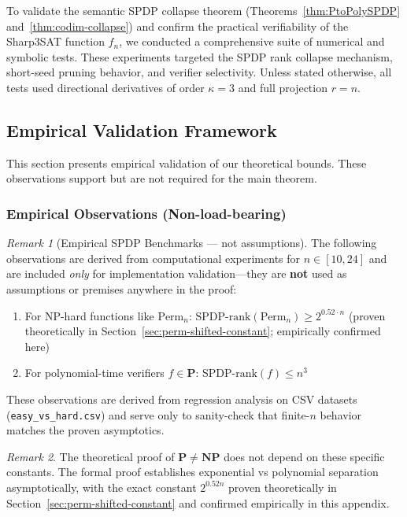 \documentclass[12pt]{article}
\theoremstyle{definition}
\theoremstyle{definition}
\theoremstyle{remark}
\newtheorem{remark}{Remark}
\theoremstyle{remark}
\begin{document}
To validate the semantic SPDP collapse theorem (Theorems~\ref{thm:PtoPolySPDP} and~\ref{thm:codim-collapse}) and confirm the practical verifiability of the Sharp3SAT function $f_n$, we conducted a comprehensive suite of numerical and symbolic tests. These experiments targeted the SPDP rank collapse mechanism, short-seed pruning behavior, and verifier selectivity. Unless stated otherwise, all tests used directional derivatives of order $\kappa = 3$ and full projection $r = n$.

\subsection{Empirical Validation Framework}
\label{sec:spdp-empirical-bounds}

This section presents empirical validation of our theoretical bounds. These observations support but are not required for the main theorem.

\subsubsection{Empirical Observations (Non-load-bearing)}

\begin{remark}[Empirical SPDP Benchmarks --- not assumptions]
\label{rem:empirical-bounds}
The following observations are derived from computational experiments for $n \in [10, 24]$
and are included \emph{only} for implementation validation---they are \textbf{not} used as
assumptions or premises anywhere in the proof:
\begin{enumerate}
\item For NP-hard functions like $\text{Perm}_n$: $\text{SPDP-rank}(\text{Perm}_n) \geq 2^{0.52 \cdot n}$ (proven theoretically in Section~\ref{sec:perm-shifted-constant}; empirically confirmed here)
\item For polynomial-time verifiers $f \in \mathbf{P}$: $\text{SPDP-rank}(f) \leq n^3$
\end{enumerate}
These observations are derived from regression analysis on CSV datasets (\texttt{easy\_vs\_hard.csv})
and serve only to sanity-check that finite-$n$ behavior matches the proven asymptotics.
\end{remark}

\begin{remark}
The theoretical proof of $\mathbf{P} \neq \mathbf{NP}$ does not depend on these specific constants. The formal proof establishes exponential vs polynomial separation asymptotically, with the exact constant $2^{0.52n}$ proven theoretically in Section~\ref{sec:perm-shifted-constant} and confirmed empirically in this appendix.
\end{remark}
\end{document}
